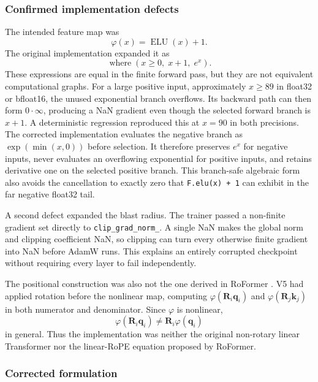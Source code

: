 \documentclass[11pt,a4paper]{article}
\theoremstyle{definition}
\theoremstyle{plain}
\newcommand{\vq}{\bm{q}}
\newcommand{\vk}{\bm{k}}
\newcommand{\mR}{\bm{R}}
\DeclareMathOperator{\ELU}{ELU}
\begin{document}
\subsubsection{Confirmed implementation defects}

The intended feature map was
\begin{equation}
    \varphi(x)=\ELU(x)+1.
\end{equation}
The original implementation expanded it as
\begin{equation}
    \operatorname{where}(x\geq0,\;x+1,\;e^x).
\end{equation}
These expressions are equal in the finite forward pass, but they are not equivalent computational graphs. For a large positive input, approximately $x\geq89$ in float32 or bfloat16, the unused exponential branch overflows. Its backward path can then form $0\cdot\infty$, producing a NaN gradient even though the selected forward branch is $x+1$. A deterministic regression reproduced this at $x=90$ in both precisions. The corrected implementation evaluates the negative branch as $\exp(\min(x,0))$ before selection. It therefore preserves $e^x$ for negative inputs, never evaluates an overflowing exponential for positive inputs, and retains derivative one on the selected positive branch. This branch-safe algebraic form also avoids the cancellation to exactly zero that \texttt{F.elu(x) + 1} can exhibit in the far negative float32 tail.

A second defect expanded the blast radius. The trainer passed a non-finite gradient set directly to \texttt{clip\_grad\_norm\_}. A single NaN makes the global norm and clipping coefficient NaN, so clipping can turn every otherwise finite gradient into NaN before AdamW runs. This explains an entirely corrupted checkpoint without requiring every layer to fail independently.

The positional construction was also not the one derived in RoFormer \cite{su2021roformer}. V5 had applied rotation before the nonlinear map, computing $\varphi(\mR_i\vq_i)$ and $\varphi(\mR_j\vk_j)$ in both numerator and denominator. Since $\varphi$ is nonlinear,
\begin{equation}
    \varphi(\mR_i\vq_i)\neq\mR_i\varphi(\vq_i)
\end{equation}
in general. Thus the implementation was neither the original non-rotary linear Transformer \cite{katharopoulos2020linear} nor the linear-RoPE equation proposed by RoFormer.

\subsubsection{Corrected formulation}
\end{document}
